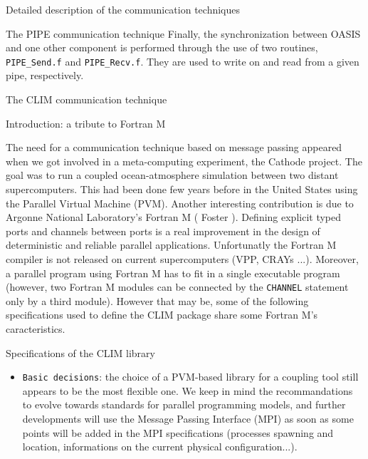 \begin{section}{Detailed description of the communication techniques}
\begin{subsection}{The PIPE communication technique}
Finally, the synchronization between OASIS and one other component 
is performed through the use of two routines, 
{\tt PIPE\_Send.f} and {\tt PIPE\_Recv.f}. They
are used to write on and read from a given pipe, respectively.

\end{subsection}

\begin{subsection}{The CLIM communication technique}
\label{subsec_climcomm}
\begin{subsubsection}{Introduction: a tribute to Fortran M}

The need for a communication technique based on message passing
appeared when we got involved in a meta-computing experiment, the
Cathode project. The goal was to run a coupled ocean-atmosphere
simulation between two distant supercomputers. This had been done few
years before in the United States \cite{mech}  using the
Parallel Virtual Machine (PVM). Another interesting contribution is due
to Argonne National Laboratory's Fortran M ( Foster \cite{fm1}). 
Defining explicit typed ports and channels
between ports is a real improvement in the design of deterministic and
reliable parallel applications. Unfortunatly the Fortran M compiler is
not released on current supercomputers (VPP, CRAYs ...). Moreover, a parallel
program using Fortran M has to fit in a single executable program (however, two
Fortran M modules can be connected by the {\tt CHANNEL} statement
only by a third module). However that may be, some of the following
specifications used to define the CLIM package 
share some Fortran M's caracteristics.

\end{subsubsection}

%
%
\begin{subsubsection}{Specifications of the CLIM library}

\begin{itemize}

\item {\tt Basic decisions}:
the choice of a PVM-based library for a coupling
tool still appears to be the most flexible one. We keep in mind the
recommandations to evolve towards standards
for parallel programming models, and further developments will
use the Message Passing Interface (MPI) as soon as some points will be
added in the MPI specifications (processes spawning and location, 
informations on the current physical configuration...). 


\end{itemize}
\end{subsubsection}
\end{subsection}
\end{section}
